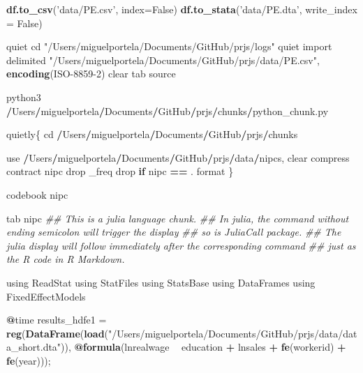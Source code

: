 \documentclass[
  12pt,
]{article}
\newenvironment{Shaded}{\begin{snugshade}}{\end{snugshade}}
\newcommand{\CommentTok}[1]{\textcolor[rgb]{0.56,0.35,0.01}{\textit{#1}}}
\newcommand{\ControlFlowTok}[1]{\textcolor[rgb]{0.13,0.29,0.53}{\textbf{#1}}}
\newcommand{\DataTypeTok}[1]{\textcolor[rgb]{0.13,0.29,0.53}{#1}}
\newcommand{\DecValTok}[1]{\textcolor[rgb]{0.00,0.00,0.81}{#1}}
\newcommand{\FloatTok}[1]{\textcolor[rgb]{0.00,0.00,0.81}{#1}}
\newcommand{\KeywordTok}[1]{\textcolor[rgb]{0.13,0.29,0.53}{\textbf{#1}}}
\newcommand{\NormalTok}[1]{#1}
\newcommand{\OperatorTok}[1]{\textcolor[rgb]{0.81,0.36,0.00}{\textbf{#1}}}
\newcommand{\StringTok}[1]{\textcolor[rgb]{0.31,0.60,0.02}{#1}}
\begin{document}
\begin{Shaded}
\begin{Highlighting}[]
\KeywordTok{df.to_csv}\NormalTok{(}\StringTok{'data/PE.csv'}\NormalTok{, }\DataTypeTok{index=}\NormalTok{False)}
\KeywordTok{df.to_stata}\NormalTok{(}\StringTok{'data/PE.dta'}\NormalTok{, }\DataTypeTok{write_index =}\NormalTok{ False)}


\NormalTok{quiet cd }\StringTok{"/Users/miguelportela/Documents/GitHub/prjs/logs"}
\NormalTok{quiet import delimited }\StringTok{"/Users/miguelportela/Documents/GitHub/prjs/data/PE.csv"}\NormalTok{, }\KeywordTok{encoding}\NormalTok{(ISO}\DecValTok{-8859-2}\NormalTok{) clear}
\NormalTok{tab source}

\NormalTok{python3 }\OperatorTok{/}\NormalTok{Users}\OperatorTok{/}\NormalTok{miguelportela}\OperatorTok{/}\NormalTok{Documents}\OperatorTok{/}\NormalTok{GitHub}\OperatorTok{/}\NormalTok{prjs}\OperatorTok{/}\NormalTok{chunks}\OperatorTok{/}\NormalTok{python_chunk.py}

\NormalTok{quietly\{}
\NormalTok{cd }\OperatorTok{/}\NormalTok{Users}\OperatorTok{/}\NormalTok{miguelportela}\OperatorTok{/}\NormalTok{Documents}\OperatorTok{/}\NormalTok{GitHub}\OperatorTok{/}\NormalTok{prjs}\OperatorTok{/}\NormalTok{chunks}

\NormalTok{use }\OperatorTok{/}\NormalTok{Users}\OperatorTok{/}\NormalTok{miguelportela}\OperatorTok{/}\NormalTok{Documents}\OperatorTok{/}\NormalTok{GitHub}\OperatorTok{/}\NormalTok{prjs}\OperatorTok{/}\NormalTok{data}\OperatorTok{/}\NormalTok{nipcs, clear}
\NormalTok{compress}
\NormalTok{contract nipc}
\NormalTok{drop _freq}
\NormalTok{drop }\ControlFlowTok{if}\NormalTok{ nipc }\OperatorTok{==}\StringTok{ }\NormalTok{.}
\NormalTok{format %
\NormalTok{\}}

\NormalTok{codebook nipc}

\NormalTok{tab nipc}
\CommentTok{## This is a julia language chunk.}
\CommentTok{## In julia, the command without ending semicolon will trigger the display}
\CommentTok{## so is JuliaCall package.}
\CommentTok{## The julia display will follow immediately after the corresponding command}
\CommentTok{## just as the R code in R Markdown.}

\NormalTok{using ReadStat}
\NormalTok{using StatFiles}
\NormalTok{using StatsBase}
\NormalTok{using DataFrames}
\NormalTok{using FixedEffectModels}

\OperatorTok{@}\NormalTok{time results_hdfe1 =}\StringTok{ }\KeywordTok{reg}\NormalTok{(}\KeywordTok{DataFrame}\NormalTok{(}\KeywordTok{load}\NormalTok{(}\StringTok{"/Users/miguelportela/Documents/GitHub/prjs/data/data_short.dta"}\NormalTok{)), }\OperatorTok{@}\KeywordTok{formula}\NormalTok{(lnrealwage }\OperatorTok{~}\StringTok{ }\NormalTok{education }\OperatorTok{+}\StringTok{ }\NormalTok{lnsales }\OperatorTok{+}\StringTok{ }\KeywordTok{fe}\NormalTok{(workerid) }\OperatorTok{+}\StringTok{ }\KeywordTok{fe}\NormalTok{(year)));}

}
\end{Highlighting}
\end{Shaded}
\end{document}
